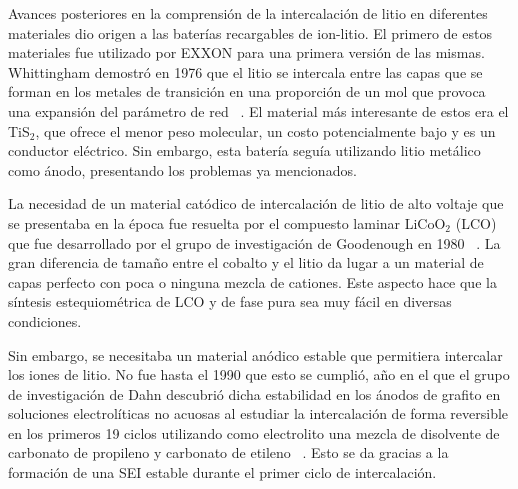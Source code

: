 Avances posteriores en la comprensión de la intercalación de litio en diferentes
materiales dio origen a las baterías recargables de ion-litio. El primero de 
estos materiales fue utilizado por EXXON para una primera versión de las mismas.
Whittingham demostró en 1976 que el litio se intercala entre las capas que se 
forman en los metales de transición en una proporción de un mol que provoca una
expansión del parámetro de red ~\cite{whittingham1976}. El material más 
interesante de estos era el TiS$_2$, que ofrece el menor peso molecular, un costo 
potencialmente bajo y es un conductor eléctrico. Sin embargo, esta batería seguía
utilizando litio metálico como ánodo, presentando los problemas ya mencionados. 

La necesidad de un material catódico de intercalación de litio de alto voltaje 
que se presentaba en la época fue resuelta por el compuesto laminar LiCoO$_2$ 
(LCO) que fue desarrollado por el grupo de investigación de Goodenough en 1980
~\cite{mizushima1980}. La gran diferencia de tamaño entre el cobalto y el litio 
da lugar a un material de capas perfecto con poca o ninguna mezcla de cationes. 
Este aspecto hace que la síntesis estequiométrica de LCO y de fase pura sea muy 
fácil en diversas condiciones. 

Sin embargo, se necesitaba un material anódico estable que permitiera intercalar
los iones de litio. No fue hasta el 1990 que esto se cumplió, año en el que el
grupo de investigación de Dahn descubrió dicha estabilidad en los ánodos de 
grafito en soluciones electrolíticas no acuosas al estudiar la intercalación de 
forma reversible en los primeros 19 ciclos utilizando como electrolito una mezcla 
de disolvente de carbonato de propileno y carbonato de etileno ~\cite{fong1990}. 
Esto se da gracias a la formación de una SEI estable durante el primer ciclo de 
intercalación. 

